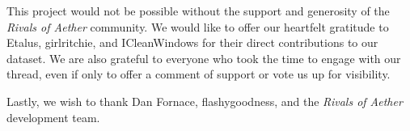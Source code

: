 \begin{acknowledgements}
\label{ch:Acknowledgements}

This project would not be possible without the support and generosity of the {\it Rivals of Aether} community. We would like to offer our heartfelt gratitude to Etalus, girlritchie, and ICleanWindows for their direct contributions to our dataset. We are also grateful to everyone who took the time to engage with our thread, even if only to offer a comment of support or vote us up for visibility.

Lastly, we wish to thank Dan Fornace, flashygoodness, and the {\it Rivals of Aether} development team.

\end{acknowledgements}
